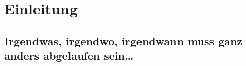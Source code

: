 \chapter*{Einleitung}

\section*{Irgendwas, irgendwo, irgendwann muss ganz anders abgelaufen sein…}

